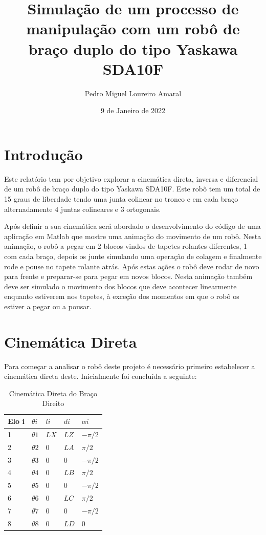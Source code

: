 \documentclass{report}
\title{Simulação de um processo de manipulação com um robô de braço duplo do tipo Yaskawa SDA10F}
\author{Pedro Miguel Loureiro Amaral}
\date{9 de Janeiro de 2022}
\begin{document}
\maketitle

\renewcommand\thesection{\arabic{section}}

\section{Introdução}

Este relatório tem por objetivo explorar a cinemática direta, inversa e diferencial de um robô de braço duplo do tipo Yaskawa SDA10F. Este robô tem um total de 15 graus de liberdade tendo uma junta colinear no tronco e em cada braço alternadamente 4 juntas colineares e 3 ortogonais.

Após definir a sua cinemática será abordado o desenvolvimento do código de uma aplicação em Matlab que mostre uma animação do movimento de um robô. Nesta animação, o robô a pegar em 2 blocos vindos de tapetes rolantes diferentes, 1 com cada braço, depois os junte simulando uma operação de colagem e finalmente rode e pouse no tapete rolante atrás. Após estas ações o robô deve rodar de novo para frente e preparar-se para pegar em novos blocos. Nesta animação também deve ser simulado o movimento dos blocos que deve acontecer linearmente enquanto estiverem nos tapetes, à exceção dos momentos em que o robô os estiver a pegar ou a pousar.

\section{Cinemática Direta}

Para começar a analisar o robô deste projeto é necessário primeiro estabelecer a cinemática direta deste. Inicialmente foi concluída a seguinte:

\begin{table}[H]
\centering
\caption{Cinemática Direta do Braço Direito}
\label{table:cinematica_direta_direito_inicial}
\begin{tabular}{ | m{1.7cm} | m{1.7cm}| m{1.7cm} | m{1.7cm} | m{1.7cm} | }
\hline
Elo i & $\theta i$ & $li$ & $di$ & $\alpha i$ \\
\hline
1 & $\theta 1$ & $LX$ & $LZ$ & $-\pi /2$ \\
\hline
2 & $\theta 2$ & $0$ & $LA$ & $\pi /2$ \\
\hline
3 & $\theta 3$ & $0$ & $0$ & $-\pi /2$ \\
\hline
4 & $\theta 4$ & $0$ & $LB$ & $\pi /2$ \\
\hline
5 & $\theta 5$ & $0$ & $0$ & $-\pi /2$ \\
\hline
6 & $\theta 6$ & $0$ & $LC$ & $\pi /2$ \\
\hline
7 & $\theta 7$ & $0$ & $0$ & $-\pi /2$ \\
\hline
8 & $\theta 8$ & $0$ & $LD$ & $0$ \\
\hline
\end{tabular}
\end{table}
\end{document}
